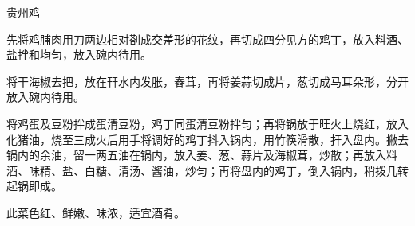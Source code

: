 \begin{recipe}{贵州鸡}

\ingredients


\cooking

\step 先将鸡脯肉用刀两边相对剳成交差形的花纹，再切成四分见方的鸡丁，放入料酒、盐拌和均匀，放入碗内待用。

\step 将干海椒去把，放在幵水内发胀，舂茸，再将姜蒜切成片，葱切成马耳朵形，分开放入碗内待用。

\step 将鸡蛋及豆粉拌成蛋清豆粉，鸡丁同蛋清豆粉拌匀；再将锅放于旺火上烧红，放入化猪油，烧至三成火后用手将调好的鸡丁抖入锅内，用竹筷滑散，扞入盘内。撇去锅内的余油，留一两五油在锅内，放入姜、葱、蒜片及海椒茸，炒散；再放入料酒、味精、盐、白糖、清汤、酱油，炒匀；再将盘内的鸡丁，倒入锅内，稍拨几转起锅即成。

\notes

此菜色红、鲜嫩、味浓，适宜酒肴。

\end{recipe}

